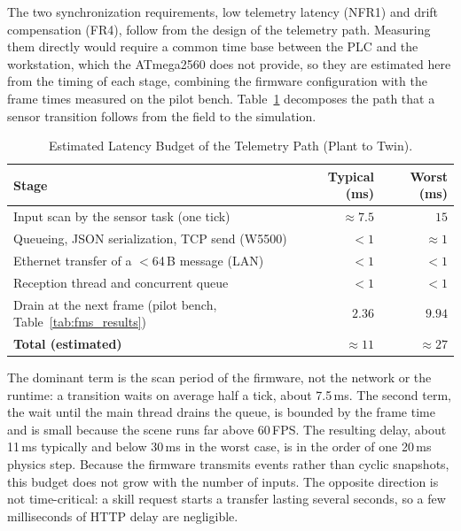 \documentclass{ieeeojies}
\begin{document}
The two synchronization requirements, low telemetry latency (NFR1) and drift compensation (FR4), follow from the design of the telemetry path. Measuring them directly would require a common time base between the PLC and the workstation, which the ATmega2560 does not provide, so they are estimated here from the timing of each stage, combining the firmware configuration with the frame times measured on the pilot bench. Table~\ref{tab:latency_budget} decomposes the path that a sensor transition follows from the field to the simulation.

\begin{table}[t]
\centering
\caption{Estimated Latency Budget of the Telemetry Path (Plant to Twin).}
\label{tab:latency_budget}
\renewcommand{\arraystretch}{1.2}
\footnotesize
\begin{tabularx}{\columnwidth}{@{}Xrr@{}}
\toprule
\textbf{Stage} & \textbf{Typical (ms)} & \textbf{Worst (ms)} \\
\midrule
Input scan by the sensor task (one tick)          & $\approx 7.5$ & $15$ \\
Queueing, JSON serialization, TCP send (W5500)     & $< 1$         & $\approx 1$ \\
Ethernet transfer of a $<$64\,B message (LAN)      & $< 1$         & $< 1$ \\
Reception thread and concurrent queue              & $< 1$         & $< 1$ \\
Drain at the next frame (pilot bench, Table~\ref{tab:fms_results}) & $2.36$ & $9.94$ \\
\midrule
\textbf{Total (estimated)}                         & $\approx 11$  & $\approx 27$ \\
\bottomrule
\end{tabularx}
\end{table}

The dominant term is the scan period of the firmware, not the network or the runtime: a transition waits on average half a tick, about 7.5\,ms. The second term, the wait until the main thread drains the queue, is bounded by the frame time and is small because the scene runs far above 60\,FPS. The resulting delay, about 11\,ms typically and below 30\,ms in the worst case, is in the order of one 20\,ms physics step. Because the firmware transmits events rather than cyclic snapshots, this budget does not grow with the number of inputs. The opposite direction is not time-critical: a skill request starts a transfer lasting several seconds, so a few milliseconds of HTTP delay are negligible.
\end{document}
